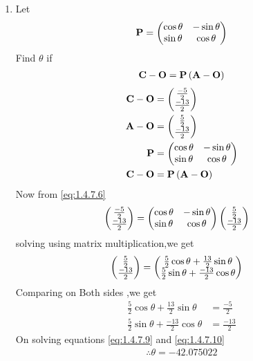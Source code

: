 \documentclass[11pt]{book}
\begin{document}
\begin{enumerate}[label=\thesection.\arabic*.,ref=\thesection.\theenumi]
\item Let 
\begin{align}
\mathbf{P} = \begin{pmatrix}\cos \theta & -\sin \theta \\ \sin \theta & \cos \theta\end{pmatrix}
\end{align}
Find $\theta$ if 
\begin{align}
\mathbf{C}-\mathbf{O}=\mathbf{P}\left(\mathbf{A}-\mathbf{O}\right)
\end{align}
\solution
\begin{align}
    \vec{C}-\vec{O}
          & =\myvec{\frac{-5}{2}\\\frac{-13}{2}}\\
\vec{A}-\vec{O}
         & =\myvec{\frac{5}{2}\\\frac{-13}{2}}
	  \\
\vec{P} &= \myvec{\cos \theta & -\sin \theta \\ \sin \theta & \cos \theta} \\
   \vec{C}-\vec{O}&=\vec{P}\brak{\vec{A}-\vec{O}} \label{eq:1.4.7.6}
\end{align}
 Now from \eqref{eq:1.4.7.6}
 \begin{align}
 \begin{pmatrix}\frac{-5}{2}\\\frac{-13}{2}\end{pmatrix}&= \begin{pmatrix}\cos \theta & -\sin \theta \\ \sin \theta & \cos \theta\end{pmatrix} \begin{pmatrix}\frac{5}{2}\\\frac{-13}{2}\end{pmatrix}    
 \end{align}
solving using matrix multiplication,we get
\begin{align}
    \begin{pmatrix}\frac{5}{2}\\\frac{-13}{2}\end{pmatrix}&=\begin{pmatrix} \frac{5}{2}\cos\theta + \frac{13}{2}\sin\theta \\ \frac{5}{2}\sin\theta + \frac{-13}{2}\cos\theta\end{pmatrix}
\end{align}
Comparing on Both sides ,we get
\begin{align}
     \frac{5}{2}\cos\theta + \frac{13}{2}\sin\theta &= \frac{-5}{2}   \label{eq:1.4.7.9}\\
 \frac{5}{2}\sin\theta + \frac{-13}{2}\cos\theta &= \frac{-13}{2} \label{eq:1.4.7.10}
\end{align}
On solving equations \eqref{eq:1.4.7.9}  and \eqref{eq:1.4.7.10}
\begin{align}
            \therefore \theta = -42.075022
\end{align}
\end{enumerate}
\end{document}
